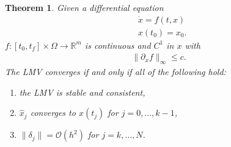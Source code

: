 \documentclass[a4paper,12pt,oneside,fleqn]{book}
\newtheorem{theorem}{Theorem}[section]
\theoremstyle{definition}
\theoremstyle{remark}
\begin{document}
\begin{theorem}
	Given a differential equation
	\begin{align*}
		& \dot{x} = f(t, x)\\
		& x(t_0) = x_0.
	\end{align*}
	$f: [t_0, t_f] \times \Omega  \rightarrow \mathbb{R}^m$ is continuous and $C^1$ in $x$ with
	\begin{align*}
		\|\partial_x f\|_\infty \le c.
	\end{align*}
	The LMV converges if and only if all of the following hold:
	\begin{enumerate}
		\item the LMV is stable and consistent,
		\item $ \hat{x}_j$ converges to $x(t_j)$ for $j = 0, \dots, k - 1$, 
		\item $ \|\delta_j\| = \mathcal{O}(h^2)$ for $j = k, \dots, N$. 
	\end{enumerate}
\end{theorem}
\end{document}
